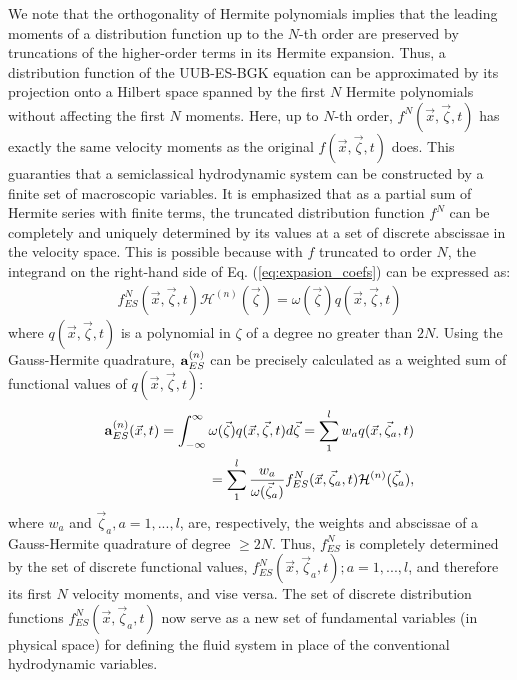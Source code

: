 \documentclass[doublecol]{epl2}
\begin{document}
We note that the orthogonality of Hermite polynomials implies that the leading moments of a distribution function up to the $N$-th order are
preserved by truncations of the higher-order terms in its Hermite expansion.  Thus, a distribution function of the UUB-ES-BGK equation can be approximated by its projection onto a Hilbert space spanned by the first $N$ Hermite polynomials without affecting the first $N$ moments.  Here, up to $N$-th order, $f^N(\vec x,\vec\zeta ,t)$ has exactly the same velocity moments as the original $f(\vec x,\vec\zeta ,t)$ does. This guaranties that a semiclassical hydrodynamic system can be constructed by a finite set of macroscopic variables.  It is emphasized that as a partial sum of Hermite series with finite terms, the truncated distribution function $f^N$ can be completely and uniquely determined by its values at a set of discrete abscissae in the velocity space.  This is possible because with $f$ truncated to order $N$, the integrand on the right-hand side of Eq. (\ref{eq:expasion_coefs}) can be expressed as:
\begin{align}
 f^N_{ES}(\vec x,\vec \zeta ,t) {{\mathcal H}}^{(n)}(\vec \zeta )=\omega (\vec \zeta ) q(\vec x,\vec \zeta, t)
\end{align}
where $q(\vec x,\vec \zeta,t)$ is a polynomial in $\zeta$ of a degree no greater than $2N$. Using the Gauss-Hermite quadrature,
${\bf a}^{(n)}_{ES}$ can be precisely calculated as a weighted sum of functional values of $q(\vec x,\vec \zeta,t)$:
\begin{eqnarray}
{\bf a}^{(n)}_{ES} (\vec x,t) = \int _{-\infty }^{\infty } \omega (\vec \zeta ) q(\vec x,\vec \zeta ,t) d\vec\zeta = \sum_1^l w_a q(\vec x,\vec \zeta_a ,t) \nonumber \\
= \sum_1^l \frac{w_a}{\omega (\vec\zeta_a )} f^N_{ES}(\vec x,\vec \zeta_a ,t) {{\mathcal H}}^{(n)} (\vec\zeta_a ),
\end{eqnarray}
where $w_a$ and $\vec \zeta_a, a=1,...,l$, are, respectively, the weights and abscissae of a Gauss-Hermite quadrature of degree $ \ge 2N$.
Thus, $f^N_{ES}$ is completely determined by the set of discrete functional values, ${f^N_{ES}(\vec x,\vec \zeta_a ,t); a =1,...,l}$, and therefore its first $N$ velocity moments, and vise versa.  The set of discrete distribution functions $f^N_{ES}(\vec x,\vec \zeta_a ,t)$ now serve as a new set of fundamental variables (in physical space) for defining the fluid system in place of the conventional hydrodynamic variables.
\end{document}
